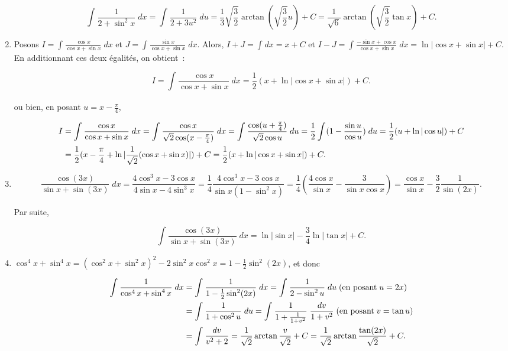 \documentclass[11pt,a4paper]{article}
\newcommand{\Arctan}{\mathop{\mathrm{arctan}}\nolimits}
\begin{document}
\begin{enumerate}
$$\int_{}^{}\frac{1}{2+\sin^2x}\;dx=\int_{}^{}\frac{1}{2+3u^2}\;du=\frac{1}{3}\sqrt{\frac{3}{2}}\Arctan(\sqrt{\frac{3}{2}}u)+C=\frac{1}{\sqrt{6}}\Arctan(\sqrt{\frac{3}{2}}\tan x)+C.$$

\item  Posons $I=\int_{}^{}\frac{\cos x}{\cos x+\sin x}\;dx$ et $J=\int_{}^{}\frac{\sin x}{\cos x+\sin x}\;dx$. Alors, $I+J=\int_{}^{}dx=x+C$ et $I-J=\int_{}^{}\frac{-\sin x+\cos x}{\cos x+\sin x}\;dx=\ln|\cos x+\sin x|+C$. En additionnant ces deux égalités, on obtient~:

$$I=\int_{}^{}\frac{\cos x}{\cos x+\sin x}\;dx=\frac{1}{2}(x+\ln|\cos x+\sin x|)+C.$$

ou bien, en posant $u=x-\frac{\pi}{4}$,

\begin{align*}\ensuremath
I&=\int_{}^{}\frac{\cos x}{\cos x+\sin x}\;dx=\int_{}^{}\frac{\cos x}{\sqrt{2}\cos(x-\frac{\pi}{4})}\;dx
=\int_{}^{}\frac{\cos(u+\frac{\pi}{4})}{\sqrt{2}\cos u}\;du=\frac{1}{2}\int_{}^{}(1-\frac{\sin u}{\cos u})\;du
=\frac{1}{2}(u+\ln|\cos u|)+C\\
 &=\frac{1}{2}(x-\frac{\pi}{4}+\ln|\frac{1}{\sqrt{2}}(\cos x+\sin x)|)+C=\frac{1}{2}(x+\ln|\cos x+\sin x|)+C.
\end{align*}

\item  

$$\frac{\cos(3x)}{\sin x+\sin(3x)}\;dx=\frac{4\cos^3x-3\cos x}{4\sin x-4\sin^3x}=\frac{1}{4}\frac{4\cos^3x-3\cos x}{\sin x(1-\sin^2x)}=\frac{1}{4}(\frac{4\cos x}{\sin x}-\frac{3}{\sin x\cos x})=\frac{\cos x}{\sin x}-\frac{3}{2}\frac{1}{\sin(2x)}.
$$

Par suite,

$$\int_{}^{}\frac{\cos(3x)}{\sin x+\sin(3x)}\;dx=\ln|\sin x|-\frac{3}{4}\ln|\tan x|+C.$$

\item  $\cos^4x+\sin^4x=(\cos^2x+\sin^2x)^2-2\sin^2x\cos^2x=1-\frac{1}{2}\sin^2(2x)$, et donc

\begin{align*}\ensuremath
\int_{}^{}\frac{1}{\cos^4x+\sin^4x}\;dx&=\int_{}^{}\frac{1}{1-\frac{1}{2}\sin^2(2x)}\;dx
=\int_{}^{}\frac{1}{2-\sin^2u}\;du\;(\mbox{en posant}\;u=2x)\\
 &=\int_{}^{}\frac{1}{1+\cos^2u}\;du=\int_{}^{}\frac{1}{1+\frac{1}{1+v^2}}\;\frac{dv}{1+v^2}\;(\mbox{en posant}\;v=\tan u)\\
 &=\int_{}^{}\frac{dv}{v^2+2}=\frac{1}{\sqrt{2}}\Arctan\frac{v}{\sqrt{2}}+C
=\frac{1}{\sqrt{2}}\Arctan\frac{\tan(2x)}{\sqrt{2}}+C.
\end{align*}


\end{enumerate}
\end{document}
